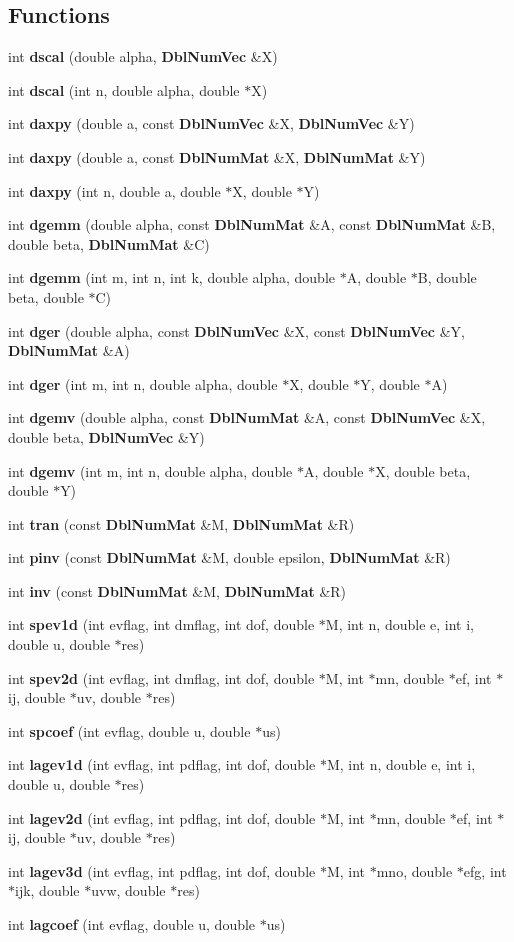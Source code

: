 \subsection*{Functions}
\begin{CompactItemize}
\item 
int {\bf dscal} (double alpha, {\bf Dbl\-Num\-Vec} \&X)
\item 
int {\bf dscal} (int n, double alpha, double $\ast$X)
\item 
int {\bf daxpy} (double a, const {\bf Dbl\-Num\-Vec} \&X, {\bf Dbl\-Num\-Vec} \&Y)
\item 
int {\bf daxpy} (double a, const {\bf Dbl\-Num\-Mat} \&X, {\bf Dbl\-Num\-Mat} \&Y)
\item 
int {\bf daxpy} (int n, double a, double $\ast$X, double $\ast$Y)
\item 
int {\bf dgemm} (double alpha, const {\bf Dbl\-Num\-Mat} \&A, const {\bf Dbl\-Num\-Mat} \&B, double beta, {\bf Dbl\-Num\-Mat} \&C)
\item 
int {\bf dgemm} (int m, int n, int k, double alpha, double $\ast$A, double $\ast$B, double beta, double $\ast$C)
\item 
int {\bf dger} (double alpha, const {\bf Dbl\-Num\-Vec} \&X, const {\bf Dbl\-Num\-Vec} \&Y, {\bf Dbl\-Num\-Mat} \&A)
\item 
int {\bf dger} (int m, int n, double alpha, double $\ast$X, double $\ast$Y, double $\ast$A)
\item 
int {\bf dgemv} (double alpha, const {\bf Dbl\-Num\-Mat} \&A, const {\bf Dbl\-Num\-Vec} \&X, double beta, {\bf Dbl\-Num\-Vec} \&Y)
\item 
int {\bf dgemv} (int m, int n, double alpha, double $\ast$A, double $\ast$X, double beta, double $\ast$Y)
\item 
int {\bf tran} (const {\bf Dbl\-Num\-Mat} \&M, {\bf Dbl\-Num\-Mat} \&R)
\item 
int {\bf pinv} (const {\bf Dbl\-Num\-Mat} \&M, double epsilon, {\bf Dbl\-Num\-Mat} \&R)
\item 
int {\bf inv} (const {\bf Dbl\-Num\-Mat} \&M, {\bf Dbl\-Num\-Mat} \&R)
\item 
int {\bf spev1d} (int evflag, int dmflag, int dof, double $\ast$M, int n, double e, int i, double u, double $\ast$res)
\item 
int {\bf spev2d} (int evflag, int dmflag, int dof, double $\ast$M, int $\ast$mn, double $\ast$ef, int $\ast$ij, double $\ast$uv, double $\ast$res)
\item 
int {\bf spcoef} (int evflag, double u, double $\ast$us)
\item 
int {\bf lagev1d} (int evflag, int pdflag, int dof, double $\ast$M, int n, double e, int i, double u, double $\ast$res)
\item 
int {\bf lagev2d} (int evflag, int pdflag, int dof, double $\ast$M, int $\ast$mn, double $\ast$ef, int $\ast$ij, double $\ast$uv, double $\ast$res)
\item 
int {\bf lagev3d} (int evflag, int pdflag, int dof, double $\ast$M, int $\ast$mno, double $\ast$efg, int $\ast$ijk, double $\ast$uvw, double $\ast$res)
\item 
int {\bf lagcoef} (int evflag, double u, double $\ast$us)
\end{CompactItemize}
